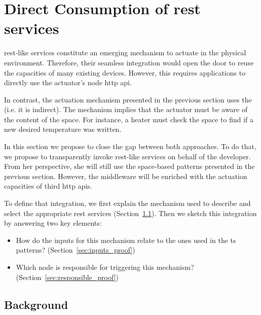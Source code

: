 
\section{Direct Consumption of \acs{rest} services}

\ac{rest}-like services constitute an emerging mechanism to actuate in the physical environment. %
Therefore, their seamless integration would open the door to reuse the capacities of many existing devices. %
However, this requires applications to directly use the actuator's node \ac{http} \ac{api}.


In contrast, the actuation mechanism presented in the previous section uses the \Space{} (i.e. it is indirect).
The mechanism implies that the actuator must be aware of the content of the space.
For instance, a heater must check the space to find if a new desired temperature was written.


In this section we propose to close the gap between both approaches. %
To do that, we propose to transparently invoke \ac{rest}-like services on behalf of the developer.
From her perspective, she will still use the space-based patterns presented in the previous section.
However, the middleware will be enriched with the actuation capacities of third \ac{http} \acp{api}.


To define that integration, we first explain the mechanism used to describe and select the appropriate \ac{rest} services (Section~\ref{sec:background_restdesc}).
Then we sketch this integration by answering two key elements:
\begin{itemize}
  \item How do the inputs for this mechanism relate to the ones used in the \ac{ts} patterns? (Section~\ref{sec:inputs_proof})
  \item Which node is responsible for triggering this mechanism? (Section~\ref{sec:responsible_proof})
\end{itemize}



\subsection{Background}
\label{sec:background_restdesc}

